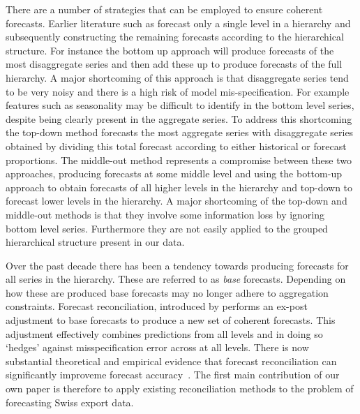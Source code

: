 \documentclass[a4paper,fleqn,11pt]{article}
\begin{document}
There are a number of strategies that can be employed to ensure coherent forecasts.  Earlier literature such as \cite{Gross1990} forecast only a single level in a hierarchy and subsequently constructing the remaining forecasts according to the hierarchical structure.  For instance the bottom up approach will produce forecasts of the most disaggregate series and then add these up to produce forecasts of the full hierarchy.  A major shortcoming of this approach is that disaggregate series tend to be very noisy and there is a high risk of model mis-specification.  For example features such as seasonality may be difficult to identify in the bottom level series, despite being clearly present in the aggregate series.  To address this shortcoming the top-down method forecasts the most aggregate series with disaggregate series obtained by dividing this total forecast according to either historical or forecast proportions.  The middle-out method represents a compromise between these two approaches, producing forecasts at some middle level and using the bottom-up approach to obtain forecasts of all higher levels in the hierarchy and top-down to forecast lower levels in the hierarchy.  A major shortcoming of the top-down and middle-out methods is that they involve some information loss by ignoring bottom level series.  Furthermore they are not easily applied to the grouped hierarchical structure present in our data.

Over the past decade there has been a tendency towards producing forecasts for all series in the hierarchy.  These are referred to as {\em base} forecasts.  Depending on how these are produced base forecasts may no longer adhere to aggregation constraints.  Forecast reconciliation, introduced by \cite{Hyndman2011} performs an ex-post adjustment to base forecasts to produce a new set of coherent forecasts. This adjustment effectively combines predictions from all levels and in doing so `hedges' against misspecification error across at all levels.  There is now substantial theoretical and empirical evidence that forecast reconciliation can significantly improveme forecast accuracy~\citep[see][and references therein]{Wickramasuriya2015}. The first main contribution of our own paper is therefore to apply existing reconciliation methods to the problem of forecasting Swiss export data.
\end{document}
